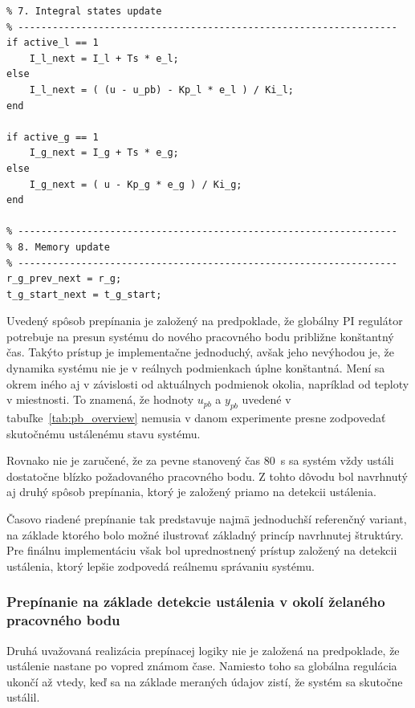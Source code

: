 \begin{lstlisting}[style=pseudocode,
caption={Pseudokód prepínania s globálnou reguláciou po určitý čas},
label={lst:pi_switch_timer_based}]
% ------------------------------------------------------------------
% 7. Integral states update
% ------------------------------------------------------------------
if active_l == 1
    I_l_next = I_l + Ts * e_l;
else
    I_l_next = ( (u - u_pb) - Kp_l * e_l ) / Ki_l;
end

if active_g == 1
    I_g_next = I_g + Ts * e_g;
else
    I_g_next = ( u - Kp_g * e_g ) / Ki_g;
end

% ------------------------------------------------------------------
% 8. Memory update
% ------------------------------------------------------------------
r_g_prev_next = r_g;
t_g_start_next = t_g_start;
\end{lstlisting}

Uvedený spôsob prepínania je založený na predpoklade,
že globálny PI regulátor potrebuje na presun systému
do nového pracovného bodu približne konštantný čas.
Takýto prístup je implementačne jednoduchý,
avšak jeho nevýhodou je,
že dynamika systému nie je v reálnych podmienkach úplne konštantná.
Mení sa okrem iného aj v závislosti od aktuálnych podmienok okolia,
napríklad od teploty v miestnosti.
To znamená,
že hodnoty $u_{pb}$ a $y_{pb}$ uvedené v tabuľke~\ref{tab:pb_overview}
nemusia v danom experimente presne zodpovedať skutočnému ustálenému stavu systému.

Rovnako nie je zaručené,
že za pevne stanovený čas $80$~s
sa systém vždy ustáli dostatočne blízko požadovaného pracovného bodu.
Z tohto dôvodu bol navrhnutý aj druhý spôsob prepínania,
ktorý je založený priamo na detekcii ustálenia.

Časovo riadené prepínanie tak predstavuje najmä jednoduchší referenčný variant,
na základe ktorého bolo možné ilustrovať základný princíp navrhnutej štruktúry.
Pre finálnu implementáciu však bol uprednostnený prístup založený na detekcii
ustálenia, ktorý lepšie zodpovedá reálnemu správaniu systému.


\subsubsection{Prepínanie na základe detekcie ustálenia v okolí želaného pracovného bodu}
\label{sec:pi_switch_settling_detection}

Druhá uvažovaná realizácia prepínacej logiky
nie je založená na predpoklade,
že ustálenie nastane po vopred známom čase.
Namiesto toho sa globálna regulácia ukončí až vtedy,
keď sa na základe meraných údajov zistí,
že systém sa skutočne ustálil.

